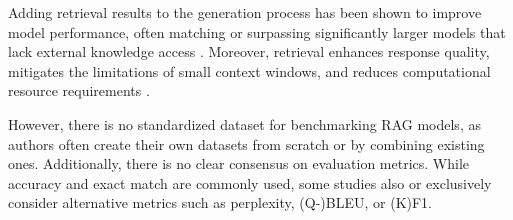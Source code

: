 Adding retrieval results to the generation process has been shown to improve model performance, often matching or surpassing significantly larger models that lack external knowledge access \cite{in-context}.
Moreover, retrieval enhances response quality, mitigates the limitations of small context windows, and reduces computational resource requirements \cite{Xu2023RetrievalML}.

However, there is no standardized dataset for benchmarking RAG models, as authors often create their own datasets from scratch or by combining existing ones.
Additionally, there is no clear consensus on evaluation metrics.
While accuracy and exact match are commonly used, some studies also \textemdash{} or exclusively \textemdash{} consider alternative metrics such as perplexity, (Q-)BLEU, or (K)F1.